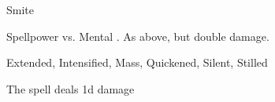 \begin{spellsection}{Smite}
\begin{spellheader}
\end{spellheader}
\begin{spellcontent}
\begin{spelltargetinginfo}
\end{spelltargetinginfo}
\begin{spelleffects}
\begin{spellattack}{Spellpower vs. Mental}
\spellsuccess {}.
\spellcritical As above, but double damage.
\end{spellattack}
\end{spelleffects}
\end{spellcontent}
\begin{spellfooter}
 Extended, Intensified, Mass, Quickened, Silent, Stilled
\end{spellfooter}
\begin{spellsubcontent}
\begin{spellcantrip}
The spell deals \minus1d damage
\end{spellcantrip}
\end{spellsubcontent}
\end{spellsection}
